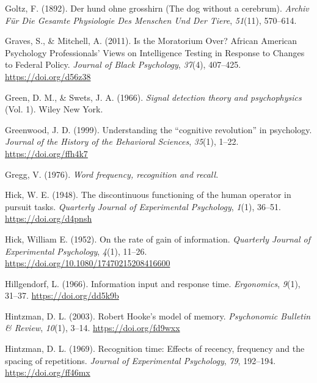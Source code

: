 \documentclass[
  oneside,
  12pt]{crumpbook}
\newlength{\cslhangindent}
\newlength{\cslentryspacingunit} %
\newenvironment{CSLReferences}[2] %
 {%
  \setlength{\parindent}{0pt}
  \ifodd #1
  \let\oldpar\par
  \def\par{\hangindent=\cslhangindent\oldpar}
  \fi
  \setlength{\parskip}{#2\cslentryspacingunit}
 }%
 {}
\begin{document}
\begin{CSLReferences}{1}{0}
\leavevmode{}%
Goltz, F. (1892). Der hund ohne grosshirn ({The} dog without a cerebrum). \emph{Archiv Für Die Gesamte Physiologie Des Menschen Und Der Tiere}, \emph{51}(11), 570--614.

\leavevmode{}%
Graves, S., \& Mitchell, A. (2011). Is the {Moratorium Over}? {African American Psychology Professionals}' {Views} on {Intelligence Testing} in {Response} to {Changes} to {Federal Policy}. \emph{Journal of Black Psychology}, \emph{37}(4), 407--425. \url{https://doi.org/d56z38}

\leavevmode{}%
Green, D. M., \& Swets, J. A. (1966). \emph{Signal detection theory and psychophysics} (Vol. 1). {Wiley New York}.

\leavevmode{}%
Greenwood, J. D. (1999). Understanding the {``cognitive revolution''} in psychology. \emph{Journal of the History of the Behavioral Sciences}, \emph{35}(1), 1--22. \url{https://doi.org/ffh4k7}

\leavevmode{}%
Gregg, V. (1976). \emph{Word frequency, recognition and recall.}

\leavevmode{}%
Hick, W. E. (1948). The discontinuous functioning of the human operator in pursuit tasks. \emph{Quarterly Journal of Experimental Psychology}, \emph{1}(1), 36--51. \url{https://doi.org/d4pnsh}

\leavevmode{}%
Hick, William E. (1952). On the rate of gain of information. \emph{Quarterly Journal of Experimental Psychology}, \emph{4}(1), 11--26. \url{https://doi.org/10.1080/17470215208416600}

\leavevmode{}%
Hillgendorf, L. (1966). Information input and response time. \emph{Ergonomics}, \emph{9}(1), 31--37. \url{https://doi.org/dd5k9b}

\leavevmode{}%
Hintzman, D. L. (2003). Robert {Hooke}'s model of memory. \emph{Psychonomic Bulletin \& Review}, \emph{10}(1), 3--14. \url{https://doi.org/fd9wxx}

\leavevmode{}%
Hintzman, D. L. (1969). Recognition time: {Effects} of recency, frequency and the spacing of repetitions. \emph{Journal of Experimental Psychology}, \emph{79}, 192--194. \url{https://doi.org/ff46mx}


\end{CSLReferences}
\end{document}
